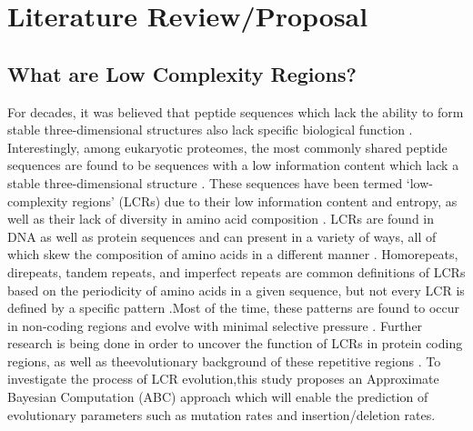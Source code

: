 \documentclass[10pt]{article}
\begin{document}
                        
\newpage
%

\section{Literature Review/Proposal}
\subsection{What are Low Complexity Regions?}
For decades, it was believed that peptide sequences which lack the ability to form stable three-dimensional structures also lack specific biological function \citep{haerty2010low}. Interestingly, among eukaryotic proteomes, the most commonly
shared peptide sequences are found to be sequences with a low information content which lack a stable three-dimensional
structure \citep{haerty2010low, marcotte1999census, bannen2007effect}. These sequences have been termed ‘low-
complexity regions’ (LCRs) due to their low information content and entropy, as well as their lack of diversity in amino acid
composition \citep{wootton1993statistics, coletta2010low}. LCRs are found in DNA as well as protein sequences and can
present in a variety of ways, all of which skew the composition of amino acids in a different manner \citep{wootton1993statistics, mier2020disentangling}. Homorepeats, direpeats, tandem repeats, and imperfect repeats are common definitions of LCRs based
on the periodicity of amino acids in a given sequence, but not every LCR is defined by a specific pattern \citep{mier2020disentangling}.Most of the time, these patterns are found to occur in non-coding regions and evolve with minimal selective pressure \citep{kruglyak2000distribution}. Further research is being done in order to uncover the function of LCRs in protein coding regions, as well as theevolutionary background of these repetitive regions \citep{huntley2006selection}. To investigate the process of LCR evolution,this study proposes an Approximate Bayesian Computation (ABC) approach which will enable the prediction of evolutionary
parameters such as mutation rates and insertion/deletion rates.
\end{document}
